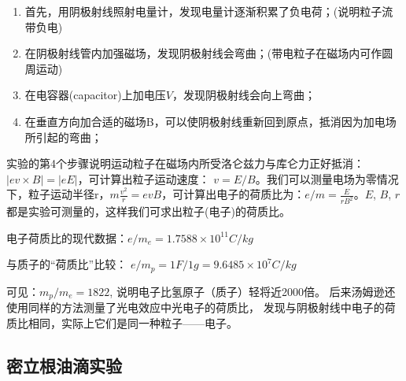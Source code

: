 \begin{enumerate}
\item{首先，用阴极射线照射电量计，发现电量计逐渐积累了负电荷；(说明粒子流带负电)}

\item{在阴极射线管内加强磁场，发现阴极射线会弯曲；(带电粒子在磁场内可作圆周运动)}

\item{在电容器(capacitor)上加电压$V$，发现阴极射线会向上弯曲；}

\item{在垂直方向加合适的磁场B，可以使阴极射线重新回到原点，抵消因为加电场所引起的弯曲；}

\end{enumerate}

实验的第4个步骤说明运动粒子在磁场内所受洛仑兹力与库仑力正好抵消：$|ev
\times B| = |eE|$，可计算出粒子运动速度： $v =
E/B$。我们可以测量电场为零情况下，粒子运动半径r，$m\frac{{v^2 }}{r}
= evB$，可计算出电子的荷质比为：$e/m = \frac{E}{{rB^2 }}$。$E$, $B$,
$r$都是实验可测量的，这样我们可求出粒子(电子)的荷质比。


电子荷质比的现代数据：$e/m_e  = 1.7588 \times 10^{11} C/kg$

与质子的“荷质比”比较： $e/m_p  = 1F/1g = 9.6485 \times 10^7 C/kg$

可见：$m_p /m_e  = 1822$, 说明电子比氢原子（质子）轻将近2000倍。
后来汤姆逊还使用同样的方法测量了光电效应中光电子的荷质比，
发现与阴极射线中电子的荷质比相同，实际上它们是同一种粒子——电子。

\subsection{密立根油滴实验}


